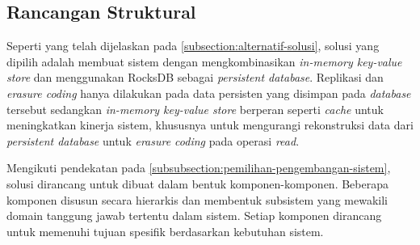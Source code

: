 \subsection{Rancangan Struktural}
\label{subsection:rancangan-struktural}

Seperti yang telah dijelaskan pada \ref{subsection:alternatif-solusi}, solusi yang dipilih adalah membuat sistem dengan mengkombinasikan \textit{in-memory key-value store} dan menggunakan RocksDB sebagai \textit{persistent database}. Replikasi dan \textit{erasure coding} hanya dilakukan pada data persisten yang disimpan pada \textit{database} tersebut sedangkan \textit{in-memory key-value store} berperan seperti \textit{cache} untuk meningkatkan kinerja sistem, khususnya untuk mengurangi rekonstruksi data dari \textit{persistent database} untuk \textit{erasure coding} pada operasi \textit{read}.

Mengikuti pendekatan pada \ref{subsubsection:pemilihan-pengembangan-sistem}, solusi dirancang untuk dibuat dalam bentuk komponen-komponen. Beberapa komponen disusun secara hierarkis dan membentuk subsistem yang mewakili domain tanggung jawab tertentu dalam sistem. Setiap komponen dirancang untuk memenuhi tujuan spesifik berdasarkan kebutuhan sistem.


